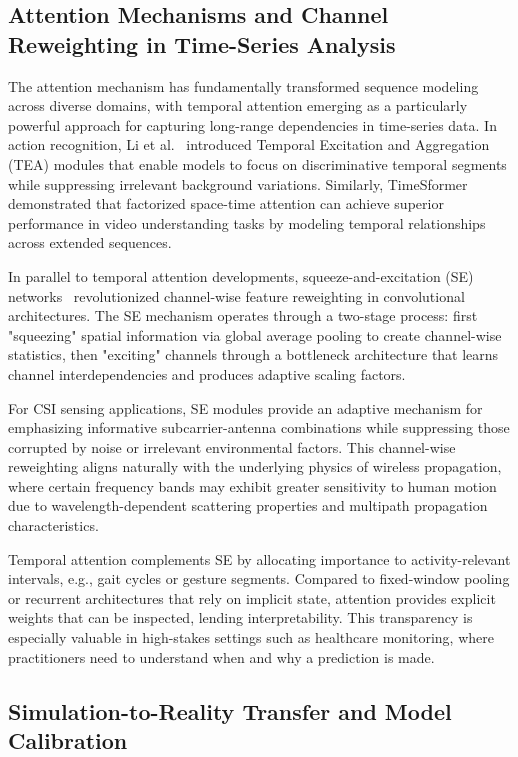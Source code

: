 \documentclass[journal]{IEEEtran}
\begin{document}
\subsection{Attention Mechanisms and Channel Reweighting in Time-Series Analysis}

The attention mechanism has fundamentally transformed sequence modeling across diverse domains, with temporal attention emerging as a particularly powerful approach for capturing long-range dependencies in time-series data. In action recognition, Li et al.~\cite{li2020tea} introduced Temporal Excitation and Aggregation (TEA) modules that enable models to focus on discriminative temporal segments while suppressing irrelevant background variations. Similarly, TimeSformer~\cite{bertasius2021timesformer} demonstrated that factorized space-time attention can achieve superior performance in video understanding tasks by modeling temporal relationships across extended sequences.

In parallel to temporal attention developments, squeeze-and-excitation (SE) networks~\cite{se_networks2018} revolutionized channel-wise feature reweighting in convolutional architectures. The SE mechanism operates through a two-stage process: first "squeezing" spatial information via global average pooling to create channel-wise statistics, then "exciting" channels through a bottleneck architecture that learns channel interdependencies and produces adaptive scaling factors.

For CSI sensing applications, SE modules provide an adaptive mechanism for emphasizing informative subcarrier-antenna combinations while suppressing those corrupted by noise or irrelevant environmental factors. This channel-wise reweighting aligns naturally with the underlying physics of wireless propagation, where certain frequency bands may exhibit greater sensitivity to human motion due to wavelength-dependent scattering properties and multipath propagation characteristics.

Temporal attention complements SE by allocating importance to activity-relevant intervals, e.g., gait cycles or gesture segments. Compared to fixed-window pooling or recurrent architectures that rely on implicit state, attention provides explicit weights that can be inspected, lending interpretability. This transparency is especially valuable in high-stakes settings such as healthcare monitoring, where practitioners need to understand when and why a prediction is made.

\subsection{Simulation-to-Reality Transfer and Model Calibration}
\end{document}
